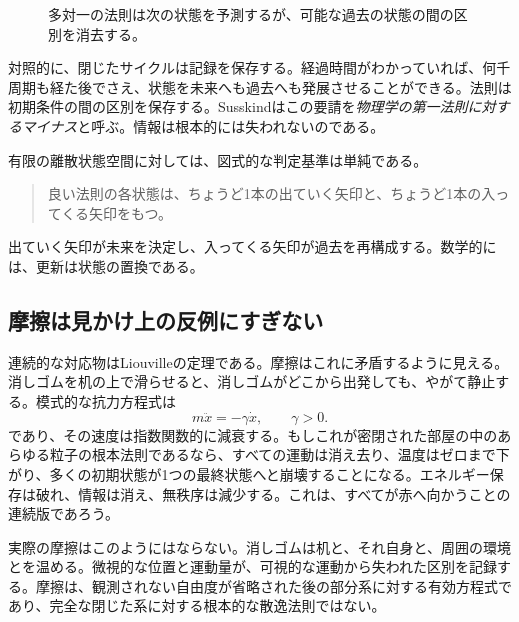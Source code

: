\begin{figure}[htbp]
\centering
{}
\caption{多対一の法則は次の状態を予測するが、可能な過去の状態の間の区別を消去する。}
\label{fig:sm1-bad-law}
\end{figure}

対照的に、閉じたサイクルは記録を保存する。経過時間がわかっていれば、何千周期も経た後でさえ、状態を未来へも過去へも発展させることができる。法則は初期条件の間の区別を保存する。Susskindはこの要請を\emph{物理学の第一法則に対するマイナス}と呼ぶ。情報は根本的には失われないのである。

有限の離散状態空間に対しては、図式的な判定基準は単純である。
\begin{quote}
良い法則の各状態は、ちょうど1本の出ていく矢印と、ちょうど1本の入ってくる矢印をもつ。
\end{quote}
出ていく矢印が未来を決定し、入ってくる矢印が過去を再構成する。数学的には、更新は状態の置換である。

\subsection{摩擦は見かけ上の反例にすぎない}

連続的な対応物はLiouvilleの定理である。摩擦はこれに矛盾するように見える。消しゴムを机の上で滑らせると、消しゴムがどこから出発しても、やがて静止する。模式的な抗力方程式は
\begin{equation}
 m\ddot x=-\gamma\dot x,
 \qquad \gamma>0.
 \label{eq:sm1-drag}
\end{equation}
であり、その速度は指数関数的に減衰する。もしこれが密閉された部屋の中のあらゆる粒子の根本法則であるなら、すべての運動は消え去り、温度はゼロまで下がり、多くの初期状態が1つの最終状態へと崩壊することになる。エネルギー保存は破れ、情報は消え、無秩序は減少する。これは、すべてが赤へ向かうことの連続版であろう。

実際の摩擦はこのようにはならない。消しゴムは机と、それ自身と、周囲の環境とを温める。微視的な位置と運動量が、可視的な運動から失われた区別を記録する。摩擦は、観測されない自由度が省略された後の部分系に対する有効方程式であり、完全な閉じた系に対する根本的な散逸法則ではない。

